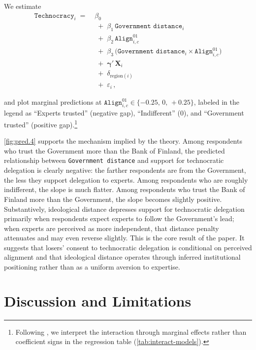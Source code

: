 \documentclass[11pt]{article}\usepackage[]{graphicx}\usepackage[]{xcolor}
\begin{document}
We estimate
\begin{equation}
\begin{aligned}
\texttt{Technocracy}_i \;=\;& \beta_0 \\[2pt]
&\;+\; \beta_1\,\texttt{Government distance}_i \\[2pt]
&\;+\; \beta_2\,\texttt{Align}^{01}_{i,c} \\[2pt]
&\;+\; \beta_3\,\bigl(\texttt{Government distance}_i \times \texttt{Align}^{01}_{i,c}\bigr) \\[2pt]
&\;+\; \boldsymbol{\gamma}'\,\mathbf{X}_i \\[2pt]
&\;+\; \delta_{\text{region}(i)} \\[2pt]
&\;+\; \varepsilon_i \, ,
\end{aligned}
\label{eq:model-interaction}
\end{equation}

and plot marginal predictions at $\texttt{Align}^{01}_{i,c} \in \{-0.25,\,0,\,+0.25\}$, labeled in the legend as ``Experts trusted'' (negative gap), ``Indifferent'' ($0$), and ``Government trusted'' (positive gap).\footnote{Following \textcite[73]{Brambor2006}, we interpret the interaction through marginal effects rather than coefficient signs in the regression table (\autoref{tab:interact-models}).}

\autoref{fig:pred.4} supports the mechanism implied by the theory. Among respondents who trust the Government more than the Bank of Finland, the predicted relationship between \texttt{Government distance} and support for technocratic delegation is clearly negative: the farther respondents are from the Government, the less they support delegation to experts. Among respondents who are roughly indifferent, the slope is much flatter. Among respondents who trust the Bank of Finland more than the Government, the slope becomes slightly positive. Substantively, ideological distance depresses support for technocratic delegation primarily when respondents expect experts to follow the Government's lead; when experts are perceived as more independent, that distance penalty attenuates and may even reverse slightly. This is the core result of the paper. It suggests that losers' consent to technocratic delegation is conditional on perceived alignment and that ideological distance operates through inferred institutional positioning rather than as a uniform aversion to expertise.

\section{Discussion and Limitations}
\end{document}

